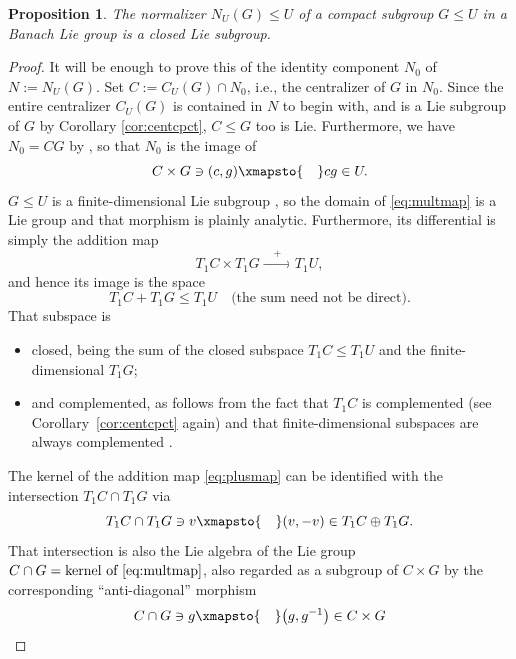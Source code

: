 \documentclass[pdftex]{sigma}
\numberwithin{equation}{section}
\newtheorem{Proposition}[Theorem]{Proposition}
 { \theoremstyle{definition}
\newtheorem{Definition}[Theorem]{Definition}
\newtheorem{Note}[Theorem]{Note}
\newtheorem{Notation}[Theorem]{Notation}
\newtheorem{Example}[Theorem]{Example}
\newtheorem{Examples}[Theorem]{Examples}
\newtheorem{Remark}[Theorem]{Remark}
\newtheorem{Remarks}[Theorem]{Remarks}
\newtheorem{Convention}[Theorem]{Convention}
}
\begin{document}
\begin{Proposition}\label{pr:normcpct}
 The normalizer $N_U(G)\le U$ of a compact subgroup $G\le U$ in a Banach Lie group is a closed Lie subgroup.
\end{Proposition}
\begin{proof}
 It will be enough to prove this of the identity component $N_0$ of $N:=N_U(G)$. Set $C:=C_U(G)\cap N_0$,
 i.e., the centralizer of $G$ in $N_0$. Since the entire centralizer $C_U(G)$ is contained in $N$ to begin with, and is a Lie subgroup of $G$ by Corollary \ref{cor:centcpct}, $C\le G$ too is Lie. Furthermore, we have~$N_0=CG$ by \cite[Theorem 2]{iw}, so that $N_0$ is the image of
 \begin{equation}\label{eq:multmap}
 C\times G\ni (c,g)\xmapsto{\quad} cg\in U.
 \end{equation}
 $G \le U$ is a finite-dimensional Lie subgroup \cite[Theorem IV.3.16]{neeb-lc}, so the domain of \eqref{eq:multmap} is a Lie group and that morphism is plainly analytic. Furthermore, its differential is simply the addition map
 \begin{equation*}
 T_1C\times T_1G\xrightarrow{\quad + \quad}T_1U,
 \end{equation*}
 and hence its image is the space
 \begin{equation}\label{eq:plusmap}
 T_1C + T_1G\le T_1U\quad\text{(the sum need not be direct)}.
 \end{equation}
 That subspace is
 \begin{itemize}\itemsep=0pt
 \item closed, being the sum of the closed subspace $T_1C\le T_1U$ and the finite-dimensional $T_1G$;
 \item and complemented, as follows from the fact that $T_1C$ is complemented (see Corollary~\ref{cor:centcpct} again) and that finite-dimensional subspaces are always complemented \cite[Theorem \mbox{7-3-6}]{wil-tvs}.
 \end{itemize}
 The kernel of the addition map \eqref{eq:plusmap} can be identified with the intersection $T_1C\cap T_1G$ via
 \begin{equation*}
 T_1C\cap T_1G\ni v\xmapsto{\quad} (v,-v)\in T_1C\oplus T_1G.
 \end{equation*}
 That intersection is also the Lie algebra of the Lie group $C\cap G = \text{kernel of \eqref{eq:multmap}}$,
 also regarded as a subgroup of $C\times G$ by the corresponding ``anti-diagonal'' morphism
 \begin{equation*}
 C\cap G\ni g\xmapsto{\quad} \big(g,g^{-1}\big)\in C\times G

\end{equation*}
\end{proof}
\end{document}
